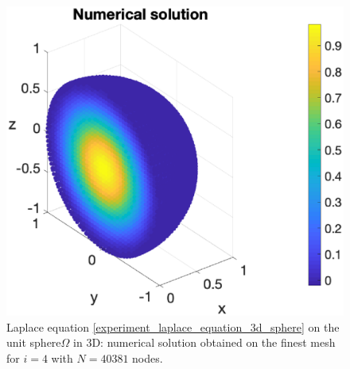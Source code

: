 \documentclass[a4paper]{article}
\begin{document}
\begin{figure}[H]
\begin{center}
\includegraphics[scale=0.5]{laplace3dsphere_numsol_Nx41.eps}
\end{center}
\caption{Laplace equation \eqref{experiment_laplace_equation_3d_sphere} on the unit sphere$\Omega$ in 3D: numerical solution obtained on the finest mesh for $i=4$ with $N= 40381$ nodes.}
\label{fig:laplace_3d_numsol_sphere}
\end{figure} 
 


\end{document}
